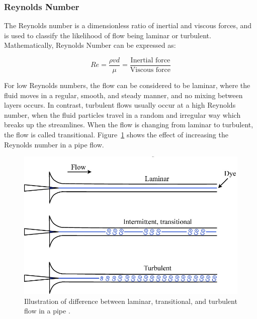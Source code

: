 \subsubsection{Reynolds Number}
The Reynolds number is a dimensionless ratio of inertial and viscous forces, and is used to classify the likelihood of flow being laminar or turbulent\cite{Rehm2008SituationalMPD}. Mathematically, Reynolds Number can be expressed as:

\begin{equation}
Re = \frac{\rho v d}{\mu} = \frac{\text{Inertial force}}{\text{Viscous force}}
\end{equation}

\noindent For low Reynolds numbers, the flow can be considered to be laminar, where the fluid moves in a regular, smooth, and steady manner, and no mixing between layers occurs\cite{Obidi2014TheoryVehicles}. In contrast, turbulent flows usually occur at a high Reynolds number, when the fluid particles travel in a random and irregular way which breaks up the streamlines. When the flow is changing from laminar to turbulent, the flow is called transitional. Figure~\ref{fig:2} shows the effect of increasing the Reynolds number in a pipe flow.

\begin{figure}[!htb]
    \centering
    \includegraphics[scale=0.4]{Figures/laminar_turbulent_difference.jpg}
    \caption{Illustration of difference between laminar, transitional, and turbulent flow in a pipe \cite{D.BARKLE2016TheoreticalPipe}.}
    \label{fig:2}
\end{figure}

